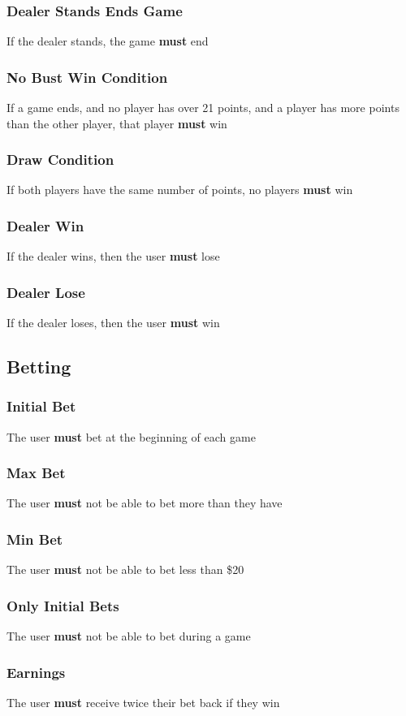 \documentclass{article}
\begin{document}
\subsubsection{Dealer Stands Ends Game}If the dealer stands, the game \textbf{must} end
\subsubsection{No Bust Win Condition} If a game ends, and no player has over 21 points, and a player has more points than the other player, that player \textbf{must} win
\subsubsection{Draw Condition} If both players have the same number of points, no players \textbf{must} win
\subsubsection{Dealer Win}If the dealer wins, then the user \textbf{must} lose
\subsubsection{Dealer Lose}If the dealer loses, then the user \textbf{must} win
\subsection{ Betting}
\subsubsection{Initial Bet}The user \textbf{must} bet at the beginning of each game
\subsubsection{Max Bet}The user \textbf{must} not be able to bet more than they have
\subsubsection{Min Bet}The user \textbf{must} not be able to bet less than \$20
\subsubsection{Only Initial Bets}The user \textbf{must} not be able to bet during a game
\subsubsection{Earnings}The user \textbf{must} receive twice their bet back if they win
\end{document}
